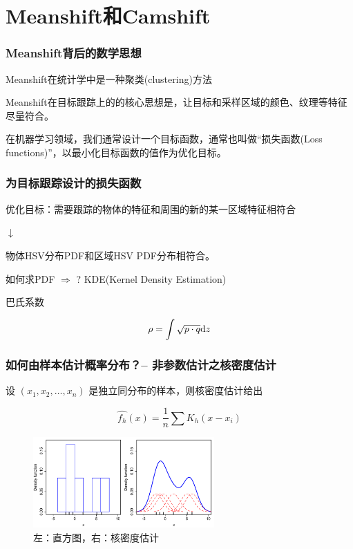 \section{Meanshift和Camshift}

\begin{frame}
    \frametitle{Meanshift背后的数学思想}
    Meanshift在统计学中是一种聚类(clustering)方法

    Meanshift在目标跟踪上的的核心思想是，让目标和采样区域的颜色、纹理等特征尽量符合。

    在机器学习领域，我们通常设计一个目标函数，通常也叫做``损失函数(Loss functions)''，以最小化目标函数的值作为优化目标。
\end{frame}


\begin{frame}
    \frametitle{为目标跟踪设计的损失函数}

    优化目标：需要跟踪的物体的特征和周围的新的某一区域特征相符合
    \begin{center}
        $\downarrow$
    \end{center}

    物体HSV分布PDF和区域HSV PDF分布相符合。

    \vspace{2em}

    如何求PDF $\Rightarrow$ ?  KDE(Kernel Density Estimation)

    巴氏系数

    \begin{equation}
        \rho = \int \sqrt{p \cdot q} \mathrm{d} z
    \end{equation}


\end{frame}


\begin{frame}
    \frametitle{如何由样本估计概率分布？-- 非参数估计之核密度估计}

    设 $(x_1, x_2, \dots, x_n)$ 是独立同分布的样本，则核密度估计给出

    \begin{equation}
        \hat{f_h} (x) = \frac{1}{n} \sum K_h(x - x_i)
    \end{equation}
    \begin{figure}
        \centering
        \includegraphics[width=0.618\textwidth]{images/Comparison_of_1D_histogram_and_KDE.png}
        \caption{左：直方图，右：核密度估计}
    \end{figure}


\end{frame}
